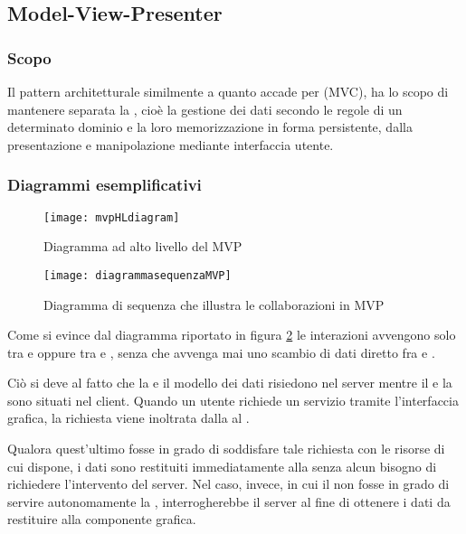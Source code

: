 \subsection{Model-View-Presenter}\label{sec:MVP}

\subsubsection{Scopo}
Il pattern architetturale  similmente a quanto accade per  (MVC), ha lo scopo di mantenere separata la , cioè la gestione dei dati secondo le regole di un determinato dominio e la loro memorizzazione in forma persistente, dalla presentazione e manipolazione mediante interfaccia utente.

\subsubsection{Diagrammi esemplificativi}
\begin{figure}[H]
  \centering
  \texttt{[image: mvpHLdiagram]}
  \caption{Diagramma ad alto livello del  MVP}\label{fig:mvpHL}
\end{figure}

\begin{figure}[H]
  \centering
  \texttt{[image: diagrammasequenzaMVP]}
  \caption{Diagramma di sequenza che illustra le collaborazioni in MVP}\label{fig:mvpSD}
\end{figure}

Come si evince dal diagramma riportato in figura \ref{fig:mvpSD} le interazioni avvengono solo tra  e  oppure tra  e , senza che avvenga mai uno scambio di dati diretto fra  e .

Ciò si deve al fatto che la  e il modello dei dati risiedono nel server mentre il  e la  sono situati nel client. Quando un utente richiede un servizio tramite l'interfaccia grafica, la richiesta viene inoltrata dalla  al .

Qualora quest'ultimo fosse in grado di soddisfare tale richiesta con le risorse di cui dispone, i dati sono restituiti immediatamente alla  senza alcun bisogno di richiedere l'intervento del server. Nel caso, invece, in cui il  non fosse in grado di servire autonomamente la , interrogherebbe il server al fine di ottenere i dati da restituire alla componente grafica.


